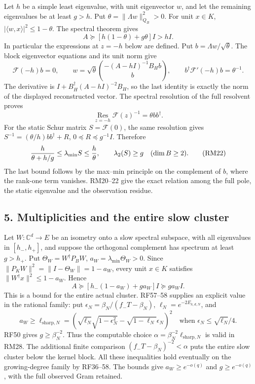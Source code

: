 \documentclass[11pt]{article}
\begin{document}
Let \(h\) be a simple least eigenvalue, with unit eigenvector \(w\), and let the remaining eigenvalues be at least \(g>h\). Put \(\theta=\|\Lambda w\|_{Q_B}^2>0\). For unit \(x\in K\), \(|\langle w,x\rangle|^2\le1-\theta\). The spectral theorem gives \[
A\succeq[h(1-\theta)+g\theta]I>hI.
\tag{RM19}
\] In particular the expressions at \(z=-h\) below are defined. Put \(b=\Lambda w/\sqrt\theta\). The block eigenvector equations and its unit norm give \[
\mathcal F(-h)b=0,\qquad
w=\sqrt\theta\binom{-(A-hI)^{-1}B_Hb}{b},
\qquad b^\dagger\mathcal F'(-h)b=\theta^{-1}.
\tag{RM20}
\] The derivative is \(I+B_H^\dagger(A-hI)^{-2}B_H\), so the last identity is exactly the norm of the displayed reconstructed vector. The spectral resolution of the full resolvent proves \[
\operatorname*{Res}_{z=-h}\mathcal F(z)^{-1}=\theta bb^\dagger.
\tag{RM21}
\] For the static Schur matrix \(S=\mathcal F(0)\), the same resolution gives \(S^{-1}=(\theta/h)bb^\dagger+R\), \(0\preceq R\preceq g^{-1}I\). Therefore \[
{h\over\theta+h/g}\le\lambda_{\min}S\le {h\over\theta},
\qquad\lambda_2(S)\ge g\quad(\dim B\ge2).
\tag{RM22}
\] The last bound follows by the max--min principle on the complement of \(b\), where the rank-one term vanishes. RM20--22 give the exact relation among the full pole, the static eigenvalue and the observation residue.

\subsection{5. Multiplicities and the entire slow cluster}\label{multiplicities-and-the-entire-slow-cluster}

Let \(W:\mathbb C^d\to E\) be an isometry onto a slow spectral subspace, with all eigenvalues in \([h_-,h_+]\), and suppose the orthogonal complement has spectrum at least \(g>h_+\). Put \(\Theta_W=W^\dagger P_BW\), \(a_W=\lambda_{\min}\Theta_W>0\). Since \(\|P_KW\|^2=\|I-\Theta_W\|=1-a_W\), every unit \(x\in K\) satisfies \(\|W^\dagger x\|^2\le1-a_W\). Hence \[
A\succeq[h_-(1-a_W)+ga_W]I\succeq ga_W I.
\tag{RM23}
\] This is a bound for the entire actual cluster. RF57--58 supplies an explicit value in the rational family: put \(\epsilon_N=\beta_N/(f_-T-\beta_N)\), \(\ell_N=e^{-2E_{k,d,N}}\), and \[
a_W\ge\ell_{\mathrm{sharp},N}
=\left(\sqrt{\ell_N}\sqrt{1-\epsilon_N^2}
-\sqrt{1-\ell_N}\epsilon_N\right)^2
\quad\text{when }\epsilon_N\le\sqrt{\ell_N}/4.
\] RF50 gives \(g\ge\beta_N^{-2}\). Thus the computable choice \(\alpha=\beta_N^{-2}\ell_{\mathrm{sharp},N}\) is valid in RM28. The additional finite comparison \((f_-T-\beta_N)^{-2}<\alpha\) puts the entire slow cluster below the kernel block. All these inequalities hold eventually on the growing-degree family by RF36--58. The bounds give \(a_W\ge e^{-o(q)}\) and \(g\ge e^{-o(q)}\), with the full observed Gram retained.
\end{document}

